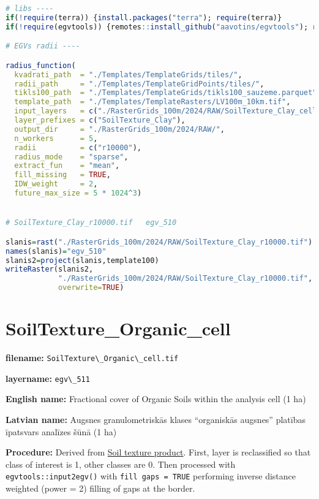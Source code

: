 \documentclass[
]{book}
\newcommand{\passthrough}[1]{#1}
\begin{document}
\begin{lstlisting}[language=R]
# libs ----
if(!require(terra)) {install.packages("terra"); require(terra)}
if(!require(egvtools)) {remotes::install_github("aavotins/egvtools"); require(egvtools)}

# EGVs radii ----

radius_function(
  kvadrati_path  = "./Templates/TemplateGrids/tiles/",
  radii_path     = "./Templates/TemplateGridPoints/tiles/",
  tikls100_path  = "./Templates/TemplateGrids/tikls100_sauzeme.parquet",
  template_path  = "./Templates/TemplateRasters/LV100m_10km.tif",
  input_layers   = c("./RasterGrids_100m/2024/RAW/SoilTexture_Clay_cell.tif"),
  layer_prefixes = c("SoilTexture_Clay"),
  output_dir     = "./RasterGrids_100m/2024/RAW/",
  n_workers      = 5,
  radii          = c("r10000"),
  radius_mode    = "sparse",
  extract_fun    = "mean",
  fill_missing   = TRUE,
  IDW_weight     = 2,
  future_max_size = 5 * 1024^3)


# SoilTexture_Clay_r10000.tif   egv_510

slanis=rast("./RasterGrids_100m/2024/RAW/SoilTexture_Clay_r10000.tif")
names(slanis)="egv_510"
slanis2=project(slanis,template100)
writeRaster(slanis2,
            "./RasterGrids_100m/2024/RAW/SoilTexture_Clay_r10000.tif",
            overwrite=TRUE)
\end{lstlisting}

\section{SoilTexture\_Organic\_cell}\label{ch06.511}

\textbf{filename:} \passthrough{\lstinline!SoilTexture\_Organic\_cell.tif!}

\textbf{layername:} \passthrough{\lstinline!egv\_511!}

\textbf{English name:} Fractional cover of Organic Soils within the analysis cell (1 ha)

\textbf{Latvian name:} Augsnes granulometriskās klases ``organiskās augsnes'' platības īpatsvars analīzes šūnā (1 ha)

\textbf{Procedure:} Derived from \hyperref[Ch05.02]{Soil texture product}. First, layer is
reclassified so that class of interest is 1, other classes are 0. Then processed
with \passthrough{\lstinline!egvtools::input2egv()!} with \passthrough{\lstinline!fill gaps = TRUE!} performing inverse
distance weighted (power = 2) filling of gaps at the border.
\end{document}
